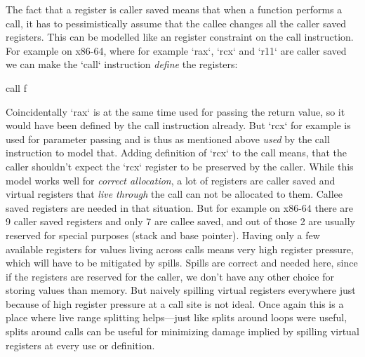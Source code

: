 The fact that a register is caller saved means that when a function performs a
call, it has to pessimistically assume that the callee changes all the caller
saved registers.
This can be modelled like an register constraint on the call instruction. For
example on x86-64, where for example `rax`, `rcx` and `r11` are caller saved we
can make the `call` instruction {\em define} the registers:

\begtt
call f %
\endtt

Coincidentally `rax` is at the same time used for passing the return value, so
it would have been defined by the call instruction already. But `rcx` for
example is used for parameter passing and is thus as mentioned above {\em used}
by the call instruction to model that. Adding definition of `rcx` to the call
means, that the caller shouldn't expect the `rcx` register to be preserved by
the caller. While this model works well for {\em correct allocation}, a lot of
registers are caller saved and virtual registers that {\em live through} the
call can not be allocated to them. Callee saved registers are needed in that
situation. But for example on x86-64 there are 9 caller saved registers and only
7 are callee saved, and out of those 2 are usually reserved for special purposes
(stack and base pointer). Having only a few available registers for values
living across calls means very high register pressure, which will have to be
mitigated by spills. Spills are correct and needed here, since if the registers
are reserved for the caller, we don't have any other choice for storing values
than memory. But naively spilling virtual registers everywhere just because of
high register pressure at a call site is not ideal. Once again this is a place
where live range splitting helps---just like splits around loops were useful,
splits around calls can be useful for minimizing damage implied by spilling
virtual registers at every use or definition.

